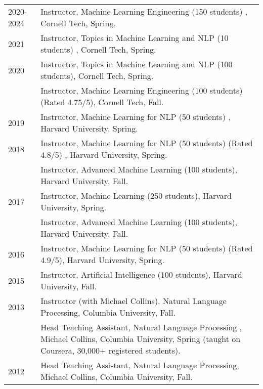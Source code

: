 \documentclass[10pt]{article}
\begin{document}
\hspace{-1cm} \begin{tabular}{lp{11.5cm}}
	2020-2024 & \ind  Instructor, Machine Learning Engineering (150 students) , Cornell Tech, Spring.                                                                       \\
	2021      & \ind  Instructor, Topics in Machine Learning and NLP (10 students) , Cornell Tech, Spring.                                                                  \\
	2020      & \ind  Instructor, Topics in Machine Learning and NLP (100 students), Cornell Tech, Spring.                                                                  \\
	          & \ind  Instructor,  Machine Learning Engineering (100 students) (Rated 4.75/5), Cornell Tech, Fall.                                                          \\

	2019      & \ind  Instructor, Machine Learning for NLP (50 students) , Harvard University, Spring.                                                                      \\

	2018      & \ind  Instructor, Machine Learning for NLP (50 students) (Rated 4.8/5) , Harvard University, Spring.                                                        \\
	          & \ind  Instructor, Advanced Machine Learning (100 students), Harvard University, Fall.                                                                       \\
	2017      & \ind  Instructor, Machine Learning (250 students), Harvard University, Spring.                                                                              \\
	          & \ind  Instructor, Advanced Machine Learning (100 students), Harvard University, Fall.                                                                       \\
	2016      & \ind  Instructor, Machine Learning for NLP (50 students) (Rated 4.9/5), Harvard University, Spring.                                                         \\
	2015      & \ind  Instructor, Artificial Intelligence (100 students), Harvard University, Fall.                                                                         \\
	2013      & \ind  Instructor (with Michael Collins), Natural Language Processing, Columbia University, Fall.                                                            \\
	          & \ind Head Teaching Assistant, Natural Language Processing , Michael Collins, Columbia University, Spring (taught on Coursera, 30,000+ registered students). \\
	2012      & \ind Head Teaching Assistant, Natural Language Processing, Michael Collins, Columbia University, Fall.                                                      \\
\end{tabular}
\end{document}
